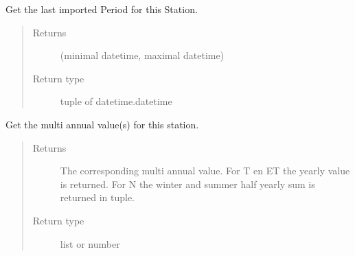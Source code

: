 \documentclass[letterpaper,10pt,english]{sphinxmanual}
\begin{document}
\begin{fulllineitems}

\begin{fulllineitems}
\label{\detokenize{weatherDB:weatherDB.station.StationBase.get_last_imp_period}}
\sphinxAtStartPar
Get the last imported Period for this Station.
\begin{quote}\begin{description}
\item[{Returns}] \leavevmode
\sphinxAtStartPar
(minimal datetime, maximal datetime)

\item[{Return type}] \leavevmode
\sphinxAtStartPar
tuple of datetime.datetime

\end{description}\end{quote}

\end{fulllineitems}


\begin{fulllineitems}
\label{\detokenize{weatherDB:weatherDB.station.StationBase.get_ma}}
\end{fulllineitems}


\begin{fulllineitems}
\label{\detokenize{weatherDB:weatherDB.station.StationBase.get_multi_annual}}
\sphinxAtStartPar
Get the multi annual value(s) for this station.
\begin{quote}\begin{description}
\item[{Returns}] \leavevmode
\sphinxAtStartPar
The corresponding multi annual value.
For T en ET the yearly value is returned.
For N the winter and summer half yearly sum is returned in tuple.

\item[{Return type}] \leavevmode
\sphinxAtStartPar
list or number


\end{description}
\end{quote}
\end{fulllineitems}
\end{fulllineitems}
\end{document}
